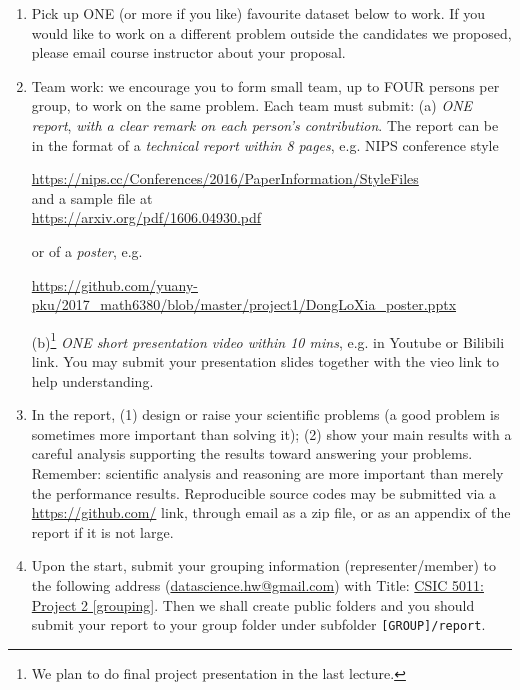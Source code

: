 \documentclass[11pt]{article}
\begin{document}
\begin{enumerate}
\item Pick up ONE (or more if you like) favourite dataset below to work. If you would like to work on a different problem outside the candidates we proposed, please email course instructor about your proposal.  
\item Team work: we encourage you to form small team, up to FOUR persons per group, to work on the same problem. Each team must submit:
\subitem(a) \emph{ONE report}, \emph{with a clear remark on each person's contribution}. The report can be in the format of a \emph{technical report within 8 pages}, e.g. NIPS conference style 
\begin{center}
\url{https://nips.cc/Conferences/2016/PaperInformation/StyleFiles} \\
\noindent and a sample file at \\
\url{https://arxiv.org/pdf/1606.04930.pdf} 
\end{center}
or of a \emph{poster}, e.g. 
\begin{center}%
\url{https://github.com/yuany-pku/2017_math6380/blob/master/project1/DongLoXia_poster.pptx}
\end{center}
\subitem*(b)\footnote{We plan to do final project presentation in the last lecture.} \emph{ONE short presentation video within 10 mins}, e.g. in Youtube or Bilibili link. You may submit your presentation slides together with the vieo link to help understanding. 
\item In the report, (1) design or raise your scientific problems (a good problem is sometimes more important than solving it); (2) show your main results with a careful analysis supporting the results toward answering your problems. Remember: scientific analysis and reasoning are more important than merely the performance results. Reproducible source codes may be submitted via a \url{https://github.com/} link, through email as a zip file, or as an appendix of the report if it is not large. 
\item Upon the start, submit your grouping information (representer/member) to the following address (\href{mailto:datascience.hw@gmail.com}{datascience.hw@gmail.com}) with Title: \underline{CSIC 5011: Project 2 [grouping]}. Then we shall create public folders and you should submit your report to your group folder under subfolder \texttt{[GROUP]/report}. %
\end{enumerate}
\end{document}
